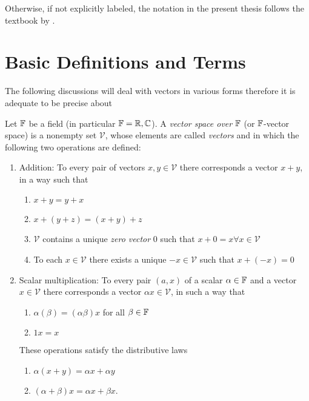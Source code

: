 Otherwise, if not explicitly labeled, the notation in the present thesis
follows the textbook by \textcite{vanBladel2007}.








\section{Basic Definitions and Terms}
\label{sec:basic_definitions_and_terms}

The following discussions will deal with vectors in various forms therefore
it is adequate to be precise about
\begin{definition}
	Let $\mathbb{F}$ be a field (in particular $\mathbb{F} = \mathbb{R},\mathbb{C}$). A \emph{vector space
	over} $\mathbb{F}$ (or $\mathbb{F}$-vector space) is a nonempty set $\mathcal{V}$, whose
	elements are called \emph{vectors} and in which the following two operations
	are defined:
	\begin{enumerate}
		\item Addition: To every pair of vectors $x, y \in \mathcal{V}$ there
		corresponds a vector $x + y$, in a way such that
		\begin{enumerate}[label=(\alph*)]
			\item $x + y = y + x$
			\item $x + \left(y + z\right) = \left(x + y\right) + z$
			\item $\mathcal{V}$ contains a unique \emph{zero vector} $0$ such
			that $x + 0 = x \forall x \in \mathcal{V}$
			\item To each $x \in \mathcal{V}$ there exists a unique
			$-x \in \mathcal{V}$ such that $x + \left(-x\right) = 0$
		\end{enumerate}
		\item Scalar multiplication: To every pair $(a, x)$ of a scalar
		$\alpha \in \mathbb{F}$ and a vector $x \in \mathcal{V}$ there corresponds a
		vector $\alpha x \in \mathcal{V}$, in such a way that
		\begin{enumerate}[label=(\alph*), start = 5]
			\item $\alpha \left(\beta\right) = \left(\alpha \beta\right) x$ for
			all $\beta \in \mathbb{F}$ 
			\item $1 x = x$
		\end{enumerate}
		These operations satisfy the distributive laws
		\begin{enumerate}[label=(\alph*), start = 7]
			\item $\alpha \left(x + y\right) = \alpha x + \alpha y$
			\item $\left(\alpha + \beta\right) x = \alpha x + \beta x$.
		\end{enumerate}
	\end{enumerate}
\end{definition}

